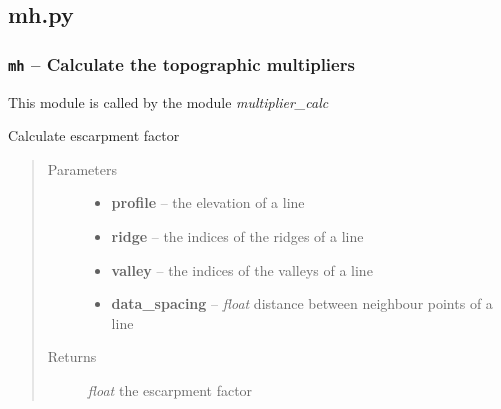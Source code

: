 \documentclass[letterpaper,10pt,english]{sphinxmanual}
\begin{document}
\subsection{mh.py}
\label{docs/topographic:mh-py}\label{docs/topographic:module-mh}

\subsubsection{\texttt{mh} -- Calculate the topographic multipliers}
\label{docs/topographic:mh-calculate-the-topographic-multipliers}
This module is called by the module \emph{multiplier\_calc}


\begin{fulllineitems}
\label{docs/topographic:mh.escarpment_factor}
Calculate escarpment factor
\begin{quote}\begin{description}
\item[{Parameters}] \leavevmode\begin{itemize}
\item {} 
\textbf{profile} --  the elevation of a line

\item {} 
\textbf{ridge} --  the indices of the ridges of a line

\item {} 
\textbf{valley} --  the indices of the valleys of a line

\item {} 
\textbf{data\_spacing} -- \emph{float} distance between neighbour points of a line

\end{itemize}

\item[{Returns}] \leavevmode
\emph{float} the escarpment factor

\end{description}\end{quote}

\end{fulllineitems}


\end{document}
